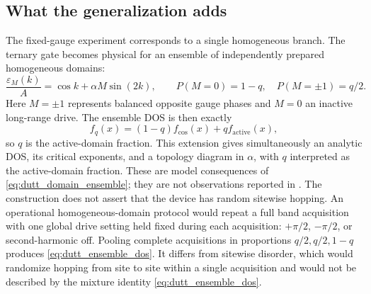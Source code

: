 \documentclass[11pt]{amsart}
\numberwithin{equation}{section}\setcounter{tocdepth}{3}\setcounter{secnumdepth}{3}
\begin{document}
\subsection{What the generalization adds}\label{subsec:dutt_extension}
The fixed-gauge experiment corresponds to a single homogeneous branch.  The ternary gate
becomes physical for an ensemble of independently prepared homogeneous domains:
\begin{equation}
 \frac{\varepsilon_M(k)}A=\cos k+\alpha M\sin(2k),\qquad
 P(M=0)=1-q,\quad P(M=\pm1)=q/2.
\label{eq:dutt_domain_ensemble}
\end{equation}
Here $M=\pm1$ represents balanced opposite gauge phases and $M=0$ an inactive
long-range drive.  The ensemble DOS is then exactly
\begin{equation}
 f_q(x)=(1-q)f_{\mathrm{cos}}(x)+qf_{\mathrm{active}}(x),
\label{eq:dutt_ensemble_dos}
\end{equation}
so $q$ is the active-domain fraction.  This extension gives simultaneously an analytic DOS, its critical exponents, and a
topology diagram in $\alpha$, with $q$ interpreted as the active-domain fraction.  These
are model consequences of \eqref{eq:dutt_domain_ensemble}; they are not observations
reported in \cite{DuttEtAl2019}.  The construction does not assert that the device has
random sitewise hopping.  An operational homogeneous-domain protocol would repeat a full
band acquisition with one global drive setting held fixed during each acquisition:
$+\pi/2$, $-\pi/2$, or second-harmonic off.  Pooling complete acquisitions in proportions
$q/2,q/2,1-q$ produces \eqref{eq:dutt_ensemble_dos}.  It differs from sitewise disorder,
which would randomize hopping from site to site within a single acquisition and would
not be described by the mixture identity \eqref{eq:dutt_ensemble_dos}.
\end{document}
